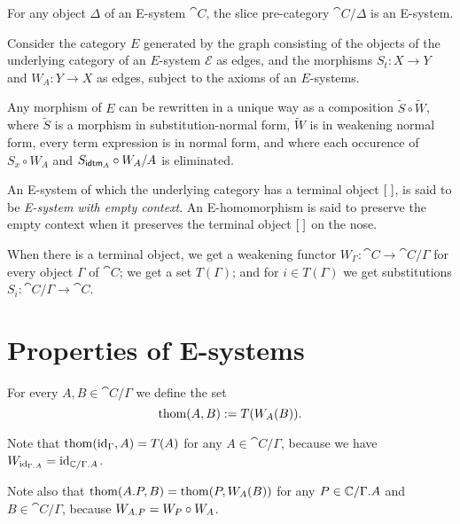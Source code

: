 \begin{cor}
For any object $\Delta$ of an E-system $\cat{C}$, the slice pre-category $\cat{C}/\Delta$
is an E-system.
\end{cor}

\begin{rmk}
Consider the category $E$ generated by the graph consisting of the objects of 
the underlying category of an $E$-system $\mathcal{E}$ as edges, and the morphisms
$S_t:X\to Y$ and $W_A:Y\to X$ as edges, subject to the axioms of an $E$-systems.
 
Any morphism of $E$ can be rewritten in a unique way
as a composition $\tilde S\circ \tilde W$, where $\tilde S$ is a morphism in
substitution-normal form, $\tilde W$ is in weakening normal form, every term
expression is in normal form, and where
each occurence of $S_x\circ W_A$ and $S_{\tfid{A}}\circ W_A/A$ is eliminated.
\end{rmk}

\begin{defn}
An E-system of which the underlying category has a terminal object ${[\;]}$, is said to
be \emph{E-system with empty context}. An E-homomorphism is said to preserve the
empty context when it preserves the terminal object ${[\;]}$ on the nose.
\end{defn}

\begin{rmk}
When there is a terminal object, we get a weakening functor $W_\Gamma:\cat{C}\to
\cat{C}/\Gamma$ for every object $\Gamma$ of $\cat{C}$; we get a set $T(\Gamma)$;
and for $i\in T(\Gamma)$ we get substitutions $S_i:\cat{C}/\Gamma\to\cat{C}$. 
\end{rmk}

\section{Properties of E-systems}

\begin{defn}
For every $A,B\in\cat{C}/\Gamma$ we define the set 
\begin{equation*}
\mathrm{thom}(A,B):=T(W_A(B)).
\end{equation*} 
\end{defn}

\begin{rmk}
Note that $\mathrm{thom}({\mathrm{id}_{\Gamma}},A)=T(A)$ for any $A\in\cat{C}/\Gamma$, 
because we have $W_{\catid{\ctxext{\Gamma}{A}}}=\catid{\cat{C}/\ctxext{\Gamma}{A}}$.

Note also that $\thom{\ctxext{A}{P}}{B}=\thom{P}{W_A(B)}$ for any $P\in\cat{C}/\ctxext{\Gamma}{A}$
and $B\in\cat{C}/\Gamma$, because $W_{\ctxext{A}{P}}=
W_P\circ W_A$.
\end{rmk}

